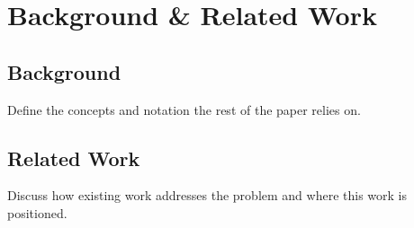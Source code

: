 \section{Background \& Related Work}
\label{sec:background}

\subsection{Background}
\label{subsec:background}

Define the concepts and notation the rest of the paper relies on.

\subsection{Related Work}
\label{subsec:related}

%

Discuss how existing work addresses the problem and where this work is positioned.
